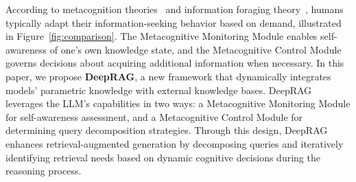 

According to metacognition theories~\cite{brown1987metacognition,jacobs1987children} and information foraging theory~\cite{info}, humans typically adapt their information-seeking behavior based on demand, illustrated in Figure~\ref{fig:comparison}.
The Metacognitive Monitoring Module enables self-awareness of one's own knowledge state, and the Metacognitive Control Module governs decisions about acquiring additional information when necessary.
% 
In this paper, we propose \textbf{DeepRAG}, a new framework that dynamically integrates models' parametric knowledge with external knowledge bases.
% 
DeepRAG leverages the LLM's capabilities in two ways: a Metacognitive Monitoring Module for self-awareness assessment, and a Metacognitive Control Module for determining query decomposition strategies.
Through this design, DeepRAG enhances retrieval-augmented generation by decomposing queries and iteratively identifying retrieval needs based on dynamic cognitive decisions during the reasoning process.


% 
% 
% 




